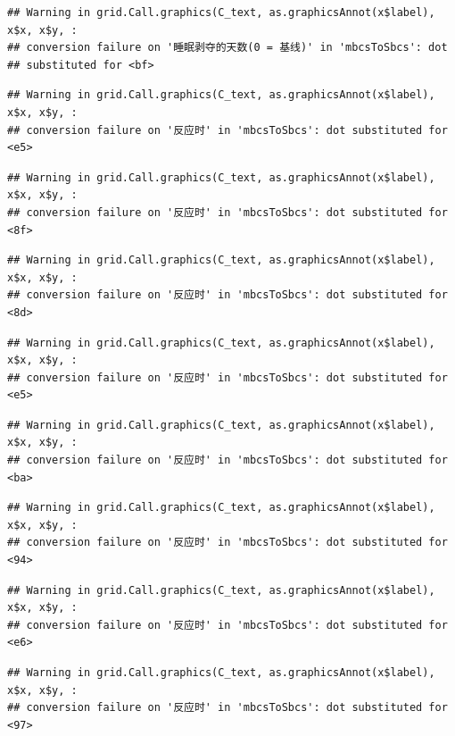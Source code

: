 \documentclass[
]{book}
\begin{document}
\begin{verbatim}
## Warning in grid.Call.graphics(C_text, as.graphicsAnnot(x$label), x$x, x$y, :
## conversion failure on '睡眠剥夺的天数(0 = 基线)' in 'mbcsToSbcs': dot
## substituted for <bf>
\end{verbatim}

\begin{verbatim}
## Warning in grid.Call.graphics(C_text, as.graphicsAnnot(x$label), x$x, x$y, :
## conversion failure on '反应时' in 'mbcsToSbcs': dot substituted for <e5>
\end{verbatim}

\begin{verbatim}
## Warning in grid.Call.graphics(C_text, as.graphicsAnnot(x$label), x$x, x$y, :
## conversion failure on '反应时' in 'mbcsToSbcs': dot substituted for <8f>
\end{verbatim}

\begin{verbatim}
## Warning in grid.Call.graphics(C_text, as.graphicsAnnot(x$label), x$x, x$y, :
## conversion failure on '反应时' in 'mbcsToSbcs': dot substituted for <8d>
\end{verbatim}

\begin{verbatim}
## Warning in grid.Call.graphics(C_text, as.graphicsAnnot(x$label), x$x, x$y, :
## conversion failure on '反应时' in 'mbcsToSbcs': dot substituted for <e5>
\end{verbatim}

\begin{verbatim}
## Warning in grid.Call.graphics(C_text, as.graphicsAnnot(x$label), x$x, x$y, :
## conversion failure on '反应时' in 'mbcsToSbcs': dot substituted for <ba>
\end{verbatim}

\begin{verbatim}
## Warning in grid.Call.graphics(C_text, as.graphicsAnnot(x$label), x$x, x$y, :
## conversion failure on '反应时' in 'mbcsToSbcs': dot substituted for <94>
\end{verbatim}

\begin{verbatim}
## Warning in grid.Call.graphics(C_text, as.graphicsAnnot(x$label), x$x, x$y, :
## conversion failure on '反应时' in 'mbcsToSbcs': dot substituted for <e6>
\end{verbatim}

\begin{verbatim}
## Warning in grid.Call.graphics(C_text, as.graphicsAnnot(x$label), x$x, x$y, :
## conversion failure on '反应时' in 'mbcsToSbcs': dot substituted for <97>
\end{verbatim}
\end{document}
